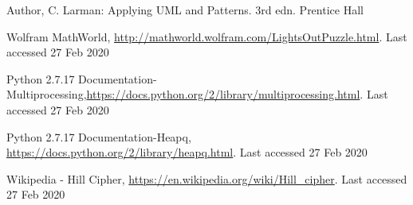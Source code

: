 \begin{thebibliography}{8}

Author, C. Larman: Applying UML and Patterns. 3rd edn. Prentice Hall

Wolfram MathWorld, \url{http://mathworld.wolfram.com/LightsOutPuzzle.html}. Last accessed 27 Feb 2020

Python 2.7.17 Documentation-Multiprocessing,\url{https://docs.python.org/2/library/multiprocessing.html}. Last accessed 27 Feb 2020

Python 2.7.17 Documentation-Heapq, \url{https://docs.python.org/2/library/heapq.html}. Last accessed 27 Feb 2020

Wikipedia - Hill Cipher, \url{https://en.wikipedia.org/wiki/Hill\_cipher}. Last accessed 27 Feb 2020



\end{thebibliography}

